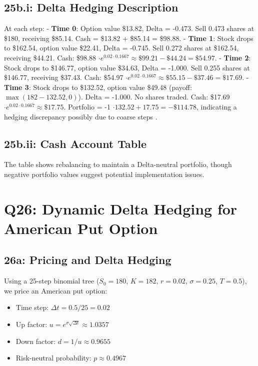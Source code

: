 \documentclass{article}
\begin{document}
\subsection*{25b.i: Delta Hedging Description}

At each step:
- \textbf{Time 0}: Option value \$13.82, Delta = -0.473. Sell 0.473 shares at \$180, receiving \$85.14. Cash = \$13.82 + \$85.14 = \$98.88.
- \textbf{Time 1}: Stock drops to \$162.54, option value \$22.41, Delta = -0.745. Sell 0.272 shares at \$162.54, receiving \$44.21. Cash: \$98.88 $\cdot e^{0.02 \cdot 0.1667} \approx \$99.21 - \$44.24 = \$54.97$.
- \textbf{Time 2}: Stock drops to \$146.77, option value \$34.63, Delta = -1.000. Sell 0.255 shares at \$146.77, receiving \$37.43. Cash: \$54.97 $\cdot e^{0.02 \cdot 0.1667} \approx \$55.15 - \$37.46 = \$17.69$.
- \textbf{Time 3}: Stock drops to \$132.52, option value \$49.48 (payoff: $\max(182 - 132.52, 0)$). Delta = -1.000. No shares traded. Cash: \$17.69 $\cdot e^{0.02 \cdot 0.1667} \approx \$17.75$. Portfolio = -1 $\cdot 132.52 + 17.75 = -\$114.78$, indicating a hedging discrepancy possibly due to coarse steps \citep{shreve2004stochastic}.

\subsection*{25b.ii: Cash Account Table}

The table shows rebalancing to maintain a Delta-neutral portfolio, though negative portfolio values suggest potential implementation issues.




\section*{Q26: Dynamic Delta Hedging for American Put Option}

\subsection*{26a: Pricing and Delta Hedging}

Using a 25-step binomial tree ($S_0 = 180$, $K = 182$, $r = 0.02$, $\sigma = 0.25$, $T = 0.5$), we price an American put option:

\begin{itemize}
    \item Time step: $\Delta t = 0.5 / 25 = 0.02$
    \item Up factor: $u = e^{\sigma \sqrt{\Delta t}} \approx 1.0357$
    \item Down factor: $d = 1/u \approx 0.9655$
    \item Risk-neutral probability: $p \approx 0.4967$
\end{itemize}
\end{document}
